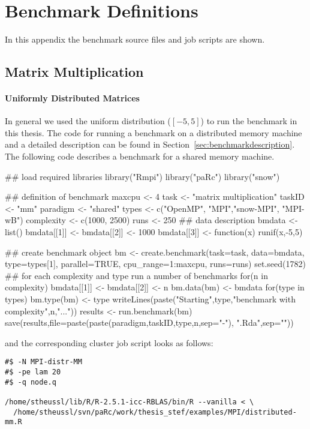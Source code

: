 \chapter{Benchmark Definitions}
\label{app:benchmark}
In this appendix the benchmark source files and job scripts are shown.

\section{Matrix Multiplication}

\subsubsection{Uniformly Distributed Matrices}

In general we used the uniform distribution ($[-5,5]$) to run the
benchmark in this thesis. The code for running a benchmark on a
distributed memory machine and a detailed description can
be found in Section~\ref{sec:benchmarkdescription}. The following code
describes a benchmark for a shared memory machine.

\begin{Scode}
## load required libraries
library("Rmpi")
library("paRc")
library("snow")

## definition of benchmark
maxcpu <- 4
task <- "matrix multiplication"
taskID <- "mm"
paradigm <- "shared"
types <- c("OpenMP", "MPI","snow-MPI", "MPI-wB")
complexity <- c(1000, 2500)
runs <- 250
## data description
bmdata <- list()
bmdata[[1]] <- bmdata[[2]] <- 1000
bmdata[[3]] <- function(x){
  runif(x,-5,5)
}

## create benchmark object
bm <- create.benchmark(task=task, data=bmdata,
                       type=types[1], parallel=TRUE,
                       cpu_range=1:maxcpu, runs=runs)
set.seed(1782)
## for each complexity and type run a number of benchmarks
for(n in complexity){
  bmdata[[1]] <- bmdata[[2]] <- n
  bm.data(bm) <- bmdata
  for(type in types){
    bm.type(bm) <- type
    writeLines(paste("Starting",type,"benchmark with complexity",n,"..."))
    results <- run.benchmark(bm)
    save(results,file=paste(paste(paradigm,taskID,type,n,sep="-"),
         ".Rda",sep=""))
  }
}
\end{Scode}

and the corresponding cluster job script looks as follows:

\begin{verbatim}
#$ -N MPI-distr-MM
#$ -pe lam 20
#$ -q node.q

/home/stheussl/lib/R/R-2.5.1-icc-RBLAS/bin/R --vanilla < \
  /home/stheussl/svn/paRc/work/thesis_stef/examples/MPI/distributed-mm.R
\end{verbatim}

